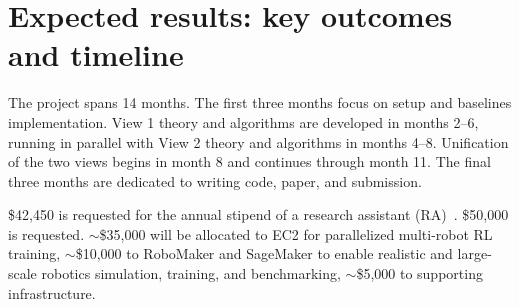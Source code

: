 \documentclass[11pt]{article}
\begin{document}



\section{Expected results: key outcomes and timeline}
The project spans 14 months. The first three months focus on setup and baselines implementation. View 1 theory and algorithms are developed in months 2–6, running in parallel with View 2 theory and algorithms in months 4–8. Unification of the two views begins in month 8 and continues through month 11. The final three months are dedicated to writing code, paper, and submission.

 \$42,450 is requested for the annual stipend of a research assistant (RA)~\citep{wpi_stipend_rates}.
\$50,000 is requested.
$\sim$\$35,000 will be allocated to EC2 for parallelized multi-robot RL training,
$\sim$\$10,000 to RoboMaker and SageMaker to enable realistic and large-scale robotics simulation, training, and benchmarking,
$\sim$\$5,000 to supporting infrastructure.




\end{document}
